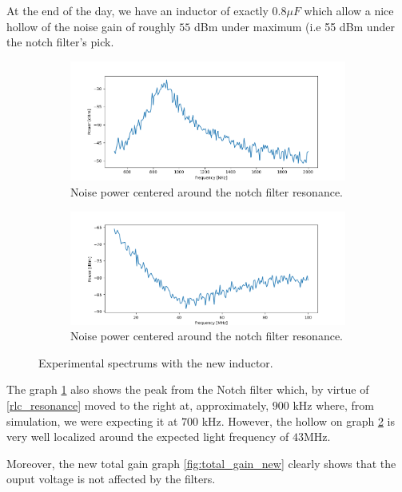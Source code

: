 \documentclass[11pt]{report}
\begin{document}
At the end of the day, we have an inductor of exactly $0.8\mu F$ which allow a nice hollow of the noise gain of roughly $55$ dBm under maximum (i.e 55 dBm under the notch filter's pick.

\begin{figure}[h!]
\centering
\begin{subfigure}{.45\textwidth}
  \centering
  \includegraphics[width=1.1\linewidth]{mpick}
  \caption{Noise power centered around the notch filter resonance.}
  \label{fig:mpeak}
\end{subfigure}%
\hspace{1em}%
\begin{subfigure}{.45\textwidth}
  \centering
  \includegraphics[width=1.1\linewidth]{mdeep}
  \caption{Noise power centered around the notch filter resonance.}
  \label{fig:mdeep}
\end{subfigure}
\caption{Experimental spectrums with the new inductor.}
\label{fig:exp_spec_m}
\end{figure}

The graph \ref{fig:mpeak} also shows the peak from the Notch filter which, by virtue of \eqref{rlc_resonance} moved to the right at, approximately, $900$ kHz where, from simulation, we were expecting it at $700$ kHz. However, the hollow on graph \ref{fig:mdeep} is very well localized around the expected light frequency of $43$MHz.

Moreover, the new total gain graph \ref{fig:total_gain_new} clearly shows that the ouput voltage is not affected by the filters.
\end{document}
